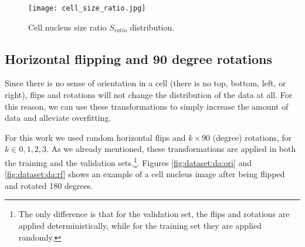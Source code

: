\begin{figure}[htb]
  \centering
  \texttt{[image: cell\_size\_ratio.jpg]}
  \caption{Cell nucleus size ratio $S_{ratio}$ distribution.}
  \label{fig:dataset:da:cs_dist}
\end{figure}

\subsection{Horizontal flipping and 90 degree rotations}

Since there is no sense of orientation in a cell (there is no top, bottom, left, or right), flips and rotations will not change the distribution of the data at all. For this reason, we can use these transformations to simply increase the amount of data and alleviate overfitting.

For this work we used random horizontal flips and $k\times90$ (degree) rotations, for $k\in{0, 1, 2, 3}$. As we already mentioned, these transformations are applied in both the training and the validation sets.\footnote{The only difference is that for the validation set, the flips and rotations are applied deterministically, while for the training set they are applied randomly.}. Figures \ref{fig:dataset:da:ori} and \ref{fig:dataset:da:rf} shows an example of a cell nucleus image after being flipped and rotated 180 degrees.

